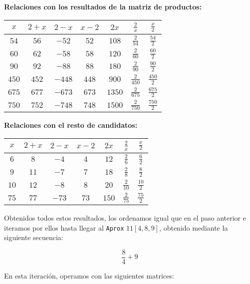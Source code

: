 \begin{center}
\textbf{Relaciones con los resultados de la matriz de productos:}

\begin{tabular}{c c c c c c c}
$x$   & $2+x$  & $2-x$  & $x-2$  & $2x$   & $\frac{2}{x}$   & $\frac{x}{2}$   \\
\midrule
$54$  & $56$   & $-52$  & $52$   & $108$  & $\frac{2}{54}$  & $\frac{54}{2}$  \\
$60$  & $62$   & $-58$  & $58$   & $120$  & $\frac{2}{60}$  & $\frac{60}{2}$  \\
$90$  & $92$   & $-88$  & $88$   & $180$  & $\frac{2}{90}$  & $\frac{90}{2}$  \\
$450$ & $452$  & $-448$ & $448$  & $900$  & $\frac{2}{450}$ & $\frac{450}{2}$ \\
$675$ & $677$  & $-673$ & $673$  & $1350$ & $\frac{2}{675}$ & $\frac{675}{2}$ \\
$750$ & $752$  & $-748$ & $748$  & $1500$ & $\frac{2}{750}$ & $\frac{750}{2}$ \\
\end{tabular}
\end{center}

\begin{center}
\textbf{Relaciones con el resto de candidatos:}

\begin{tabular}{c c c c c c c}
$x$  & $2+x$ & $2-x$ & $x-2$  & $2x$  & $\frac{2}{x}$   & $\frac{x}{2}$   \\
\midrule
$6$  & $8$   & $-4$  & $4$    & $12$  & $\frac{2}{6}$   & $\frac{6}{2}$   \\
$9$  & $11$  & $-7$  & $7$    & $18$  & $\frac{2}{8}$   & $\frac{8}{2}$   \\
$10$ & $12$  & $-8$  & $8$    & $20$  & $\frac{2}{10}$  & $\frac{10}{2}$  \\
$75$ & $77$  & $-73$ & $73$   & $150$ & $\frac{2}{75}$  & $\frac{75}{2}$  \\
\end{tabular}
\end{center}

Obtenidos todos estos resultados, los ordenamos igual que en el paso anterior e iteramos por ellos hasta llegar al \texttt{Aprox} $11[4,8,9]$, obtenido mediante la siguiente secuencia:

\begin{center}
\[\frac{8}{4}+9\]
\end{center}

En esta iteración, operamos con las siguientes matrices:

